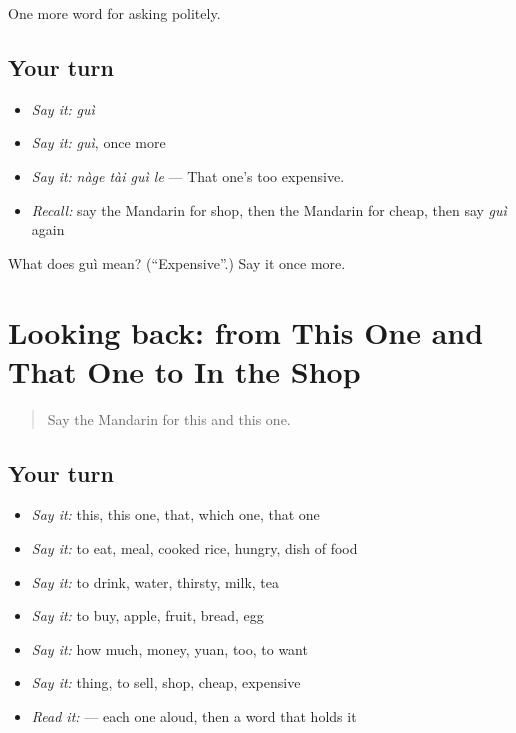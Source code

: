 \begin{grammarlens}[title={What you've built}]
One more word for asking politely.
\end{grammarlens}

\subsection*{Your turn}
\begin{itemize}
\raggedright
  \item \emph{Say it:} \emph{guì}
  \item \emph{Say it:} \emph{guì}, once more
  \item \emph{Say it:} \emph{nàge tài guì le} — That one's too expensive.
  \item \emph{Recall:} say the Mandarin for shop, then the Mandarin for cheap, then say \emph{guì} again
\end{itemize}

\begin{tcolorbox}[breakable,colback=teal!4,colframe=teal!35!black,title={Before you move on}]
What does guì mean? (\textquotedblleft{}Expensive\textquotedblright{}.) Say it once more.
\end{tcolorbox}
\section[(dialogue)]{Looking back: from This One and That One to In the Shop}

\label{lesson:ZH-R42-review-37-42}



\begin{quote}
Say the Mandarin for this and this one.
\end{quote}

\subsection*{Your turn}
\begin{itemize}
\raggedright
  \item \emph{Say it:} this, this one, that, which one, that one
  \item \emph{Say it:} to eat, meal, cooked rice, hungry, dish of food
  \item \emph{Say it:} to drink, water, thirsty, milk, tea
  \item \emph{Say it:} to buy, apple, fruit, bread, egg
  \item \emph{Say it:} how much, money, yuan, too, to want
  \item \emph{Say it:} thing, to sell, shop, cheap, expensive
  \item \emph{Read it:}          — each one aloud, then a word that holds it
\end{itemize}

